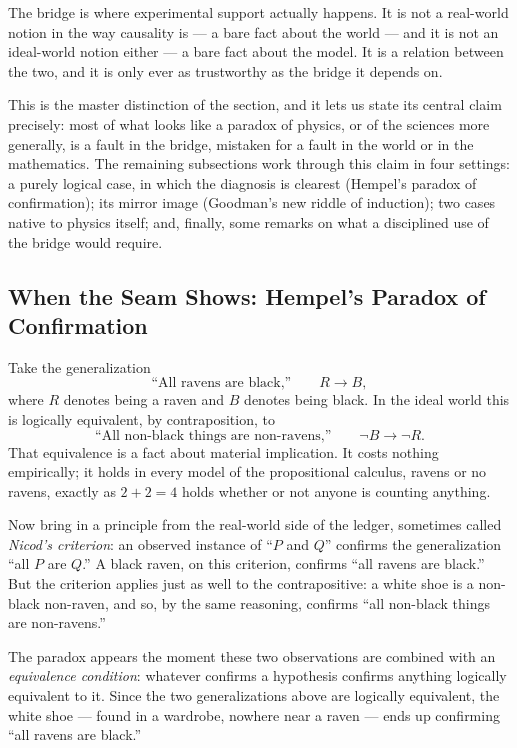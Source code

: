 The bridge is where experimental support actually happens. It is not a
real-world notion in the way causality is --- a bare fact about the world ---
and it is not an ideal-world notion either --- a bare fact about the model. It
is a relation between the two, and it is only ever as trustworthy as the bridge
it depends on.

This is the master distinction of the section, and it lets us state its central
claim precisely: most of what looks like a paradox of physics, or of the
sciences more generally, is a fault in the bridge, mistaken for a fault in the
world or in the mathematics. The remaining subsections work through this claim
in four settings: a purely logical case, in which the diagnosis is clearest
(Hempel's paradox of confirmation); its mirror image (Goodman's new riddle of
induction); two cases native to physics itself; and, finally, some remarks on
what a disciplined use of the bridge would require.

\subsection{When the Seam Shows: Hempel's Paradox of Confirmation}

Take the generalization
\[
\text{``All ravens are black,''} \qquad R \to B,
\]
where $R$ denotes being a raven and $B$ denotes being black. In the ideal world
this is logically equivalent, by contraposition, to
\[
\text{``All non-black things are non-ravens,''} \qquad \neg B \to \neg R.
\]
That equivalence is a fact about material implication. It costs nothing
empirically; it holds in every model of the propositional calculus, ravens or
no ravens, exactly as $2+2=4$ holds whether or not anyone is counting anything.

Now bring in a principle from the real-world side of the ledger, sometimes
called \emph{Nicod's criterion}: an observed instance of ``$P$ and $Q$''
confirms the generalization ``all $P$ are $Q$.'' A black raven, on
this criterion, confirms ``all ravens are black.'' But the criterion applies
just as well to the contrapositive: a white shoe is a non-black non-raven, and
so, by the same reasoning, confirms ``all non-black things are non-ravens.''

The paradox appears the moment these two observations are combined with an
\emph{equivalence condition}: whatever confirms a hypothesis confirms anything
logically equivalent to it. Since the two generalizations above are logically
equivalent, the white shoe --- found in a wardrobe, nowhere near a raven ---
ends up confirming ``all ravens are black.''

